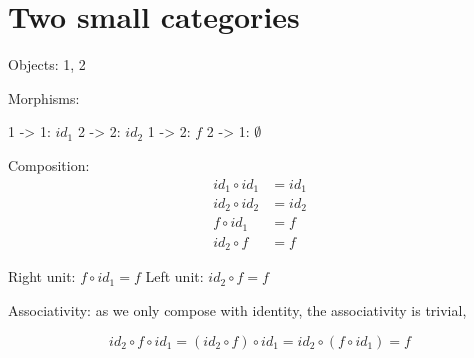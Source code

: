 \section{Two small categories}

Objects: 1, 2

Morphisms: 

1 -> 1: $id_1$
2 -> 2: $id_2$
1 -> 2: $f$
2 -> 1: $\emptyset$

Composition:
\begin{align*} 
  id_1 \circ id_1 &= id_1 \\
  id_2 \circ id_2 &= id_2 \\
     f \circ id_1 &= f \\
     id_2 \circ f &= f 
\end{align*} 

Right unit: $f \circ id_1 = f$
Left unit: $id_2 \circ f = f$

Associativity: as we only compose with identity, the associativity is trivial,

$$
   id_2 \circ f \circ  id_1 = (id_2 \circ f) \circ  id_1 = id_2 \circ  (f \circ id_1) = f
$$
